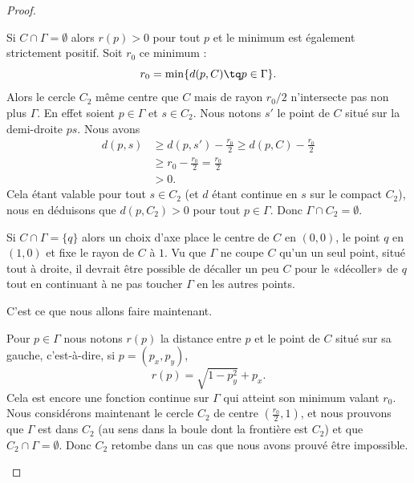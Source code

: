 \begin{proof}
\begin{subproof}
\begin{subproof}
			Si \( C\cap \Gamma=\emptyset\) alors \( r(p)>0\) pour tout \( p\) et le minimum est également strictement positif. Soit \( r_0\) ce minimum :
			\begin{equation}
				r_0=\min\{ d(p,C)\tq p\in \Gamma \}.
			\end{equation}
			Alors le cercle \( C_2\) même centre que \( C\) mais de rayon \( r_0/2\) n'intersecte pas non plus \( \Gamma\). En effet soient \( p\in \Gamma\) et \( s\in C_2\). Nous notons \( s'\) le point de \( C\) situé sur la demi-droite \( ps\). Nous avons
			\begin{subequations}
				\begin{align}
					d(p,s) & \geq d(p,s')-\frac{ r_0 }{2}  \geq d(p,C)-\frac{ r_0 }{2} \\
					       & \geq r_0-\frac{ r_0 }{2}      =\frac{ r_0 }{2}            \\
					       & >0.
				\end{align}
			\end{subequations}
			Cela étant valable pour tout \( s\in C_2\) (et \( d\) étant continue en \( s\) sur le compact \( C_2\)), nous en déduisons que \( d(p,C_2)>0\) pour tout \( p\in \Gamma\). Donc \( \Gamma\cap C_2=\emptyset\).


			Si \( C\cap \Gamma=\{ q \}\) alors un choix d'axe place le centre de \( C\) en \( (0,0)\), le point \( q\) en \( (1,0)\) et fixe le rayon de \( C\) à \( 1\). Vu que \( \Gamma\) ne coupe \( C\) qu'un un seul point, situé tout à droite, il devrait être possible de décaller un peu \( C\) pour le «décoller» de \( q\) tout en continuant à ne pas toucher \( \Gamma\) en les autres points.

			C'est ce que nous allons faire maintenant.

			Pour \( p\in \Gamma\) nous notons \( r(p)\) la distance entre \( p\) et le point de \( C\) situé sur sa gauche, c'est-à-dire, si \( p=(p_x,p_y)\),
			\begin{equation}		\label{EQooCWRDooRzwqKi}
				r(p)=\sqrt{ 1-p_y^2 }+p_x.
			\end{equation}
			Cela est encore une fonction continue sur \( \Gamma\) qui atteint son minimum valant \( r_0\). Nous considérons maintenant le cercle \( C_2\) de centre \( (\frac{ r_0 }{ 2 },1)\), et nous prouvons que \( \Gamma\) est dans \( C_2\) (au sens dans la boule dont la frontière est \( C_2\)) et que \( C_2\cap\Gamma=\emptyset\). Donc \( C_2\) retombe dans un cas que nous avons prouvé être impossible.


\end{subproof}
\end{subproof}
\end{proof}
